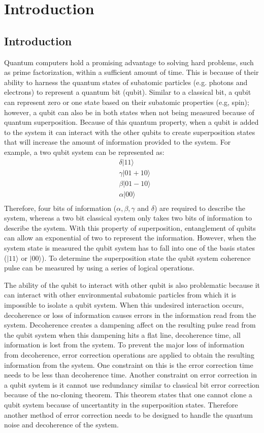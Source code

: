 \chapter{Introduction}
\label{chap:intro}
\section{Introduction}
 Quantum computers hold a promising advantage to solving hard problems, such as prime factorization, within a sufficient amount of time. This is because of their ability to harness the quantum states of subatomic particles (e.g. photons and electrons) to represent a quantum bit (qubit). Similar to a classical bit, a qubit can represent zero or one state based on their subatomic properties (e.g, spin); however, a qubit can also be in both states when not being measured because of quantum superposition. Because of this quantum property, when a qubit is added to the system it can interact with the other qubits to create superposition states that will increase the amount of information provided to the system. For example, a two qubit system can be represented as: 
\begin{align*}
&\delta |11\big\rangle \\ 
&\gamma |01 + 10 \big\rangle \\
&\beta  |01 - 10 \big\rangle \\
&\alpha |00 \big\rangle \\
&\end{align*}
Therefore, four bits of information ($\alpha,\beta,\gamma$ and $\delta$) are required to describe the system, whereas a two bit classical system only takes two bits of information to describe the system. With this property of superposition, entanglement of qubits can allow an exponential of two to represent the information. However, when the system state is measured the qubit system has to fall into one of the basis states ($|11\big\rangle$ or $|00 \big\rangle$). To determine the superposition state the qubit system coherence pulse can be measured by using a series of logical operations. 

The ability of the qubit to interact with other qubit is also problematic because it can interact with other environmental subatomic particles from which it is impossible to isolate a qubit system. When this undesired interaction occurs, decoherence or loss of information causes errors in the information read from the system. Decoherence creates a dampening affect on the resulting pulse read from the qubit system when this dampening hits a flat line, decoherence time, all information is lost from the system. To prevent the major loss of information from decoherence, error correction operations are applied to obtain the resulting information from the system. One constraint on this is the error correction time needs to be less than decoherence time. Another constraint on error correction in a qubit system is it cannot use redundancy similar to classical bit error correction because of the no-cloning theorem. This theorem states that one cannot clone a qubit system because of uncertantity in the superposition states. Therefore another method of error correction needs to be designed to handle the quantum noise and decoherence of the system. 

